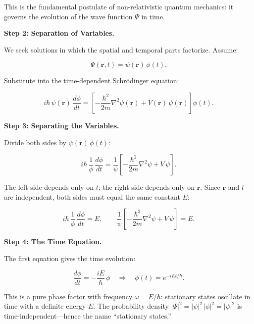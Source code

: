 This is the fundamental postulate of non-relativistic quantum mechanics: it governs the evolution of the wave function $\Psi$ in time.

\textbf{Step 2: Separation of Variables.}

We seek solutions in which the spatial and temporal parts factorize. Assume:

\begin{equation}
\Psi(\mathbf{r}, t) = \psi(\mathbf{r})\,\phi(t).
\end{equation}

Substitute into the time-dependent Schr\"odinger equation:

\begin{equation}
i\hbar\,\psi(\mathbf{r})\,\frac{d\phi}{dt} = \left[-\frac{\hbar^2}{2m}\nabla^2\psi(\mathbf{r}) + V(\mathbf{r})\,\psi(\mathbf{r})\right]\phi(t).
\end{equation}

\textbf{Step 3: Separating the Variables.}

Divide both sides by $\psi(\mathbf{r})\,\phi(t)$:

\begin{equation}
i\hbar\,\frac{1}{\phi}\,\frac{d\phi}{dt} = \frac{1}{\psi}\left[-\frac{\hbar^2}{2m}\nabla^2\psi + V\,\psi\right].
\end{equation}

The left side depends only on $t$; the right side depends only on $\mathbf{r}$. Since $\mathbf{r}$ and $t$ are independent, both sides must equal the same constant $E$:

\begin{equation}
i\hbar\,\frac{1}{\phi}\,\frac{d\phi}{dt} = E, \qquad \frac{1}{\psi}\left[-\frac{\hbar^2}{2m}\nabla^2\psi + V\,\psi\right] = E.
\end{equation}

\textbf{Step 4: The Time Equation.}

The first equation gives the time evolution:

\begin{equation}
\frac{d\phi}{dt} = -\frac{iE}{\hbar}\,\phi \quad \Longrightarrow \quad \phi(t) = e^{-iEt/\hbar}.
\end{equation}

This is a pure phase factor with frequency $\omega = E/\hbar$: stationary states oscillate in time with a definite energy $E$. The probability density $|\Psi|^2 = |\psi|^2\,|\phi|^2 = |\psi|^2$ is time-independent---hence the name ``stationary states.''

